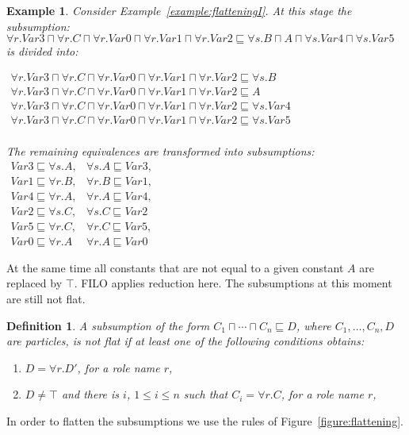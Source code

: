 \documentclass{article}
\newtheorem{example}{Example}
\newtheorem{definition}{Definition}
\begin{document}
\begin{example}
	Consider Example~\ref{example:flatteningI}. At this stage the subsumption:
	$\forall r.Var3 \sqcap \forall r.C \sqcap \forall r.Var0 \sqcap \forall r.Var1 \sqcap \forall r.Var2 \sqsubseteq \forall s.B \sqcap A \sqcap \forall s.Var4 \sqcap \forall s.Var5$ is divided into:
	
	$\begin{array}{l}
	\forall r.Var3 \sqcap \forall r.C \sqcap \forall r.Var0 \sqcap \forall r.Var1 \sqcap \forall r.Var2 \sqsubseteq \forall s.B \\
	\forall r.Var3 \sqcap \forall r.C \sqcap \forall r.Var0 \sqcap \forall r.Var1 \sqcap \forall r.Var2 \sqsubseteq  A 	\\
	\forall r.Var3 \sqcap \forall r.C \sqcap \forall r.Var0 \sqcap \forall r.Var1 \sqcap \forall r.Var2 \sqsubseteq \forall s.Var4\\
\forall r.Var3 \sqcap \forall r.C \sqcap \forall r.Var0 \sqcap \forall r.Var1 \sqcap \forall r.Var2 \sqsubseteq  \forall s.Var5\\
		\end{array}$
		
		The remaining equivalences are transformed into subsumptions:\\
		$\begin{array}{ll}
				Var3 \sqsubseteq \forall s. A, & \forall s.A \sqsubseteq Var3,\\
			Var1\sqsubseteq\forall r. B, & \forall r.B \sqsubseteq Var1,\\
			Var4\sqsubseteq\forall r.A, & \forall r.A \sqsubseteq Var4,\\		
			Var2\sqsubseteq \forall s.C, & \forall s.C \sqsubseteq Var2\\
			Var5 \sqsubseteq\forall r.C, & \forall r.C \sqsubseteq Var5,\\
			Var0 \sqsubseteq \forall r.A & \forall r.A \sqsubseteq Var0
			\end{array}$
\end{example}

At the same time all constants that are not equal to a given constant $A$ are replaced by $\top$. FILO applies reduction here.
The subsumptions at this moment are still not flat.

\begin{definition}
	A subsumption of the form $C_1 \sqcap \cdots \sqcap C_n \sqsubseteq D$, where $C_1, \dots, C_n, D$ are particles, is \emph{not flat} if at least one of the following conditions obtains:
	\begin{enumerate}
		\item $D = \forall r.D'$, for a role name $r$,
		\item $D \not=\top$ and there is $i$, $1\le i \le n$ such that $C_i = \forall r.C$, for a role name $r$,
	\end{enumerate}
	\end{definition}
In order to flatten the subsumptions we use the  rules of Figure~\ref{figure:flattening}.
\end{document}
